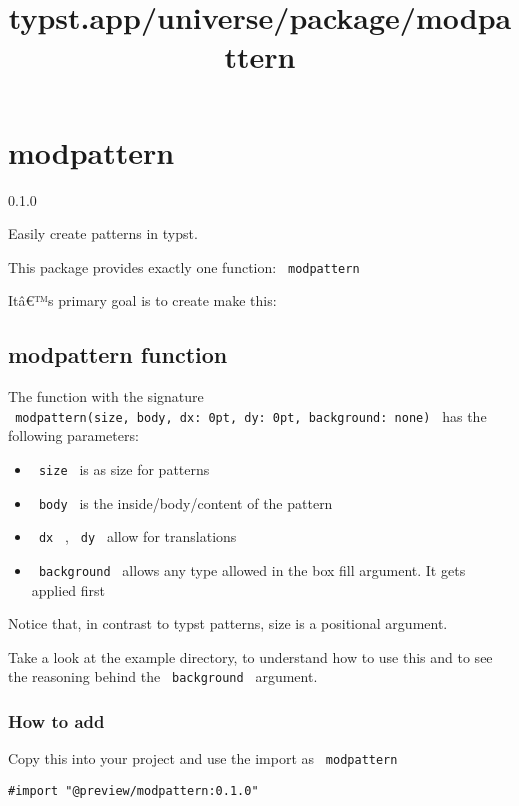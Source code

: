 \title{typst.app/universe/package/modpattern}

\label{banner}
\section{modpattern}\label{modpattern}

{ 0.1.0 }

Easily create patterns in typst.

\label{readme}
This package provides exactly one function: \texttt{\ modpattern\ }

Itâ€™s primary goal is to create make this:

\subsection{modpattern function}\label{modpattern-function}

The function with the signature
\texttt{\ modpattern(size,\ body,\ dx:\ 0pt,\ dy:\ 0pt,\ background:\ none)\ }
has the following parameters:

\begin{itemize}
\tightlist
\item
  \texttt{\ size\ } is as size for patterns
\item
  \texttt{\ body\ } is the inside/body/content of the pattern
\item
  \texttt{\ dx\ } , \texttt{\ dy\ } allow for translations
\item
  \texttt{\ background\ } allows any type allowed in the box fill
  argument. It gets applied first
\end{itemize}

Notice that, in contrast to typst patterns, size is a positional
argument.

Take a look at the example directory, to understand how to use this and
to see the reasoning behind the \texttt{\ background\ } argument.

\subsubsection{How to add}\label{how-to-add}

Copy this into your project and use the import as
\texttt{\ modpattern\ }

\begin{verbatim}
#import "@preview/modpattern:0.1.0"
\end{verbatim}

